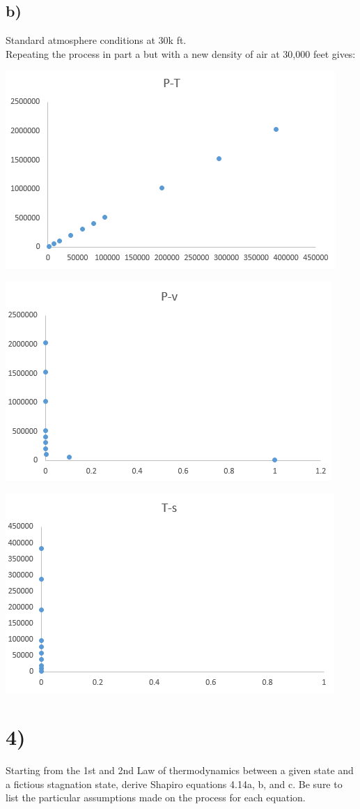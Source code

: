 \documentclass[preview,12pt]{article}
\begin{document}
    \subsection*{b)}
        Standard atmosphere conditions at 30k ft. 
        $$$$
        Repeating the process in part a but with a new density of air at 30,000 feet gives:
        
        \begin{center}
        \includegraphics[width=.5\textwidth]{HW2_PT2.PNG}
        \end{center}
        \begin{center}
        \includegraphics[width=.5\textwidth]{HW2_pv2.PNG}
        \end{center}
        \begin{center}
        \includegraphics[width=.5\textwidth]{HW2_ts2.PNG}
        \end{center}        
        
        
\section*{4)}
    Starting from the 1st and 2nd Law of thermodynamics between a given state and a fictious stagnation state, derive Shapiro equations 4.14a, b, and c. Be sure to list the particular assumptions made on the process for each equation.
    
\end{document}
